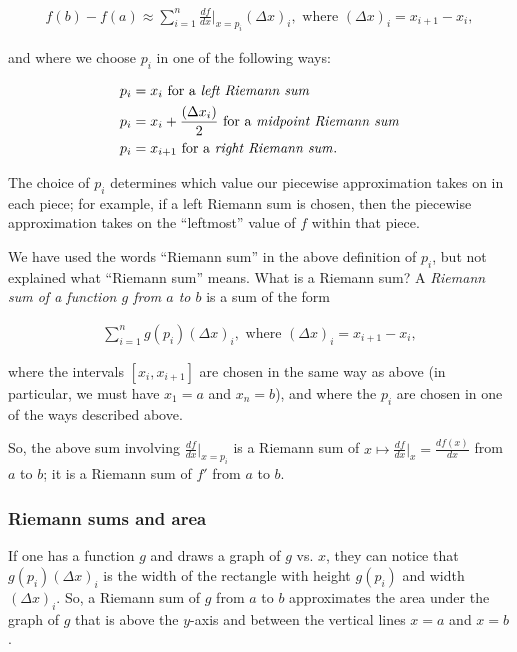 \begin{align*}
    f(b) - f(a) \approx \sum_{i = 1}^n \frac{df}{dx}\Big|_{x = p_i} (\Delta x)_i, \text{ where $(\Delta x)_i = x_{i + 1} - x_i$},
\end{align*}

and where we choose $p_i$ in one of the following ways:

\begin{align*}
 p_i &= x_i \text{ for a \textit{left Riemann sum}} \\
 p_i &= x_i + \frac{(\Delta x_i)}{2} \text{ for a \textit{midpoint Riemann sum}} \\
 p_i &= x_{i + 1} \text{ for a \textit{right Riemann sum}}.
\end{align*}

The choice of $p_i$ determines which value our piecewise approximation takes on in each piece; for example, if a left Riemann sum is chosen, then the piecewise approximation takes on the ``leftmost'' value of $f$ within that piece.

We have used the words ``Riemann sum'' in the above definition of $p_i$, but not explained what ``Riemann sum'' means. What is a Riemann sum? A \textit{Riemann sum of a function $g$ from $a$ to $b$} is a sum of the form

\begin{align*}
    \sum_{i = 1}^n g(p_i) (\Delta x)_i, \text{ where $(\Delta x)_i = x_{i + 1} - x_i$},
\end{align*}

where the intervals $[x_i, x_{i + 1}]$ are chosen in the same way as above (in particular, we must have $x_1 = a$ and $x_n = b$), and where the $p_i$ are chosen in one of the ways described above.

So, the above sum involving $\frac{df}{dx}\Big|_{x = p_i}$ is a Riemann sum of $x \mapsto \frac{df}{dx}\Big|_x = \frac{df(x)}{dx}$ from $a$ to $b$; it is a Riemann sum of $f'$ from $a$ to $b$.

\subsubsection*{Riemann sums and area}

If one has a function $g$ and draws a graph of $g$ vs. $x$, they can notice that $g(p_i) (\Delta x)_i$ is the width of the rectangle with height $g(p_i)$ and width $(\Delta x)_i$. So, a Riemann sum of $g$ from $a$ to $b$ approximates the area under the graph of $g$ that is above the $y$-axis and between the vertical lines $x = a$ and $x = b$.

